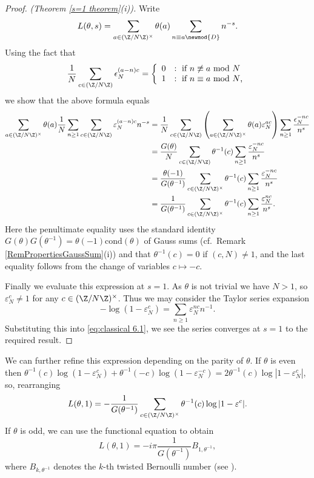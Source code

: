 \documentclass[a4paper,10pt, english, reqno]{smfart}
\numberwithin{equation}{section}
\begin{document}
\begin{proof}\emph{(Theorem \ref{s=1 theorem}(i)).}
 Write
 \[ L(\theta,s) = \sum_{a \in (\Z / N \Z)^\times} \theta(a) \sum_{n \equiv a \newmod{D}} n^{-s}. \]
 Using the fact that
 \[ \frac{1}{N} \sum_{c \in (\Z / N \Z)} \epsilon_N^{(a - n)c} = \left \{
   \begin{array}{c l}
      0 &: \text{ if $n \not \equiv a$ mod $N$} \\
      1 &: \text{ if $n \equiv a$ mod $N$,}
   \end{array}
   \right. \]
   we show that the above formula equals
   \begin{align}
   \sum_{a \in (\Z / N \Z)^\times} \theta(a) \frac{1}{N} \sum_{n \geq 1} \sum_{c \in (\Z / N \Z)} \varepsilon_N^{(a - n) c} n^{-s} &= \frac{1}{N} \sum_{c \in (\Z / N \Z)} \left( \sum_{a \in (\Z / N \Z)^\times} \theta(a) \varepsilon_N^{ ac} \right) \sum_{n \geq 1} \frac{\epsilon_N^{- n c}}{n^{s}} \notag\\
   &= \frac{G(\theta)}{N} \sum_{c \in (\Z / N \Z)} \theta^{-1}(c) \sum_{n \geq 1} \frac{\varepsilon_N^{- n c}}{n^{s}} \notag\\
   &= \frac{\theta(-1)}{G(\theta^{-1})} \sum_{c \in (\Z / N \Z)^\times} \theta^{-1}(c) \sum_{n \geq 1} \frac{\varepsilon_N^{- n c}}{n^{s}} \notag\\
   &= \frac{1}{G(\theta^{-1})} \sum_{c \in (\Z / N \Z)^\times} \theta^{-1}(c) \sum_{n \geq 1} \frac{\varepsilon_N^{ n c}}{n^{s}}. \label{eq:classical 6.1}
   \end{align}
Here the penultimate equality uses the standard identity $G(\theta)G(\theta^{-1}) = \theta(-1) \mathrm{cond}(\theta)$ of Gauss sums (cf.\ Remark \ref{RemPropertiesGaussSum}(i)) and that $\theta^{-1}(c) = 0$ if $(c, N) \neq 1$, and the last equality follows from the change of variables $c \mapsto -c$. 

Finally we evaluate this expression at $s = 1$. As $\theta$ is not trivial we have $N>1$, so $\varepsilon_N^c \neq 1$ for any $c \in (\Z/N\Z)^\times$. Thus we may consider the Taylor series expansion 
\[	
	-\log(1-\varepsilon_N^{c}) = \sum_{n\geq 1}\varepsilon_N^{nc}n^{-1}.
\] Substituting this into \eqref{eq:classical 6.1}, we see the series converges at $s=1$ to the required result.
\end{proof}

\begin{rem} \label{s=1}
 We can further refine this expression depending on the parity of $\theta$. If $\theta$ is even then $\theta^{-1}(c)\log(1-\varepsilon_N^{c}) + \theta^{-1}(-c)\log(1-\varepsilon_N^{-c}) = 2\theta^{-1}(c)\log|1-\varepsilon_N^c|$, so, rearranging
 \[ L(\theta,1) = - \frac{1}{G(\theta^{-1})} \sum_{c \in (\Z / N \Z)^\times} \theta^{-1}(c) \log |1 - \varepsilon^{c} |.  \]
If $\theta$ is odd, we can use the functional equation to obtain
 \[ L(\theta,1) = -i \pi \frac{1}{G(\theta^{-1})} B_{1, \theta^{-1}}, \]
 where $B_{k,\theta^{-1}}$ denotes the $k$-th twisted Bernoulli number (see \cite[Chapter 4]{Washington2}).
\end{rem}
\end{document}
